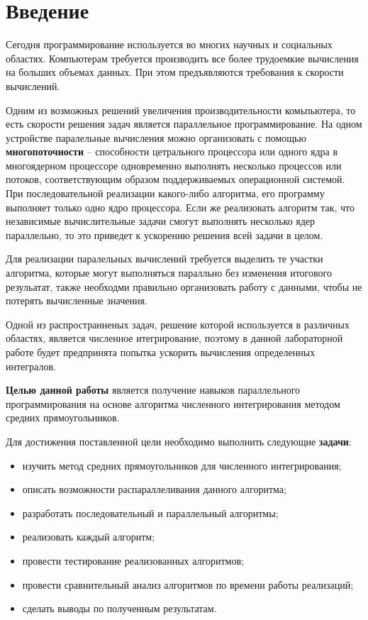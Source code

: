 \chapter*{Введение}

Сегодня программирование используется во многих научных и социальных областях.
Компьютерам требуется производить все более трудоемкие вычисления на больших
объемах данных. При этом предъявляются требования к скорости вычислений.

Одним из возможных решений увеличения производительности комьпьютера, то есть
скорости решения задач является параллельное программирование. На одном
устройстве паралельные вычисления можно организовать с помощью
\textbf{многопоточности} -- способности цетрального процессора или одного ядра
в многоядерном процессоре одновременно выполнять несколько процессов или
потоков, соответствующим образом поддерживаемых операционной системой. При
последовательной реализации какого-либо алгоритма, его программу выполняет
только одно ядро процессора. Если же реализовать алгоритм так, что независимые
вычислительные задачи смогут выполнять несколько ядер параллельно, то это
приведет к ускорению решения всей задачи в целом\cite{intro}.

Для реализации паралельных вычислений требуется выделить те участки алгоритма,
которые могут выполняться паралльно без изменения итогового резульатат, 
также необходми правильно организовать работу с данными, чтобы не потерять
вычисленные значения.

Одной из распространненых задач, решение которой используется в различных
областях, является численное итегрирование, поэтому в данной лабораторной
работе будет предпринята попытка ускорить вычисления определенных интегралов.

\textbf{Целью данной работы} является получение навыков
параллельного программирования на основе алгоритма
численного интегрирования методом средних прямоугольников.

Для достижения поставленной цели необходимо выполнить следующие
\textbf{задачи}:
\begin{itemize}[left=\parindent]
    \item изучить метод средних прямоугольников для численного интегрирования;
    \item описать возможности распараллеливания данного алгоритма;
    \item разработать последовательный и параллельный алгоритмы;
    \item реализовать каждый алгоритм;
    \item провести тестирование реализованных алгоритмов;
    \item провести сравнительный анализ алгоритмов по времени работы
          реализаций;
    \item сделать выводы по полученным результатам.
\end{itemize}
